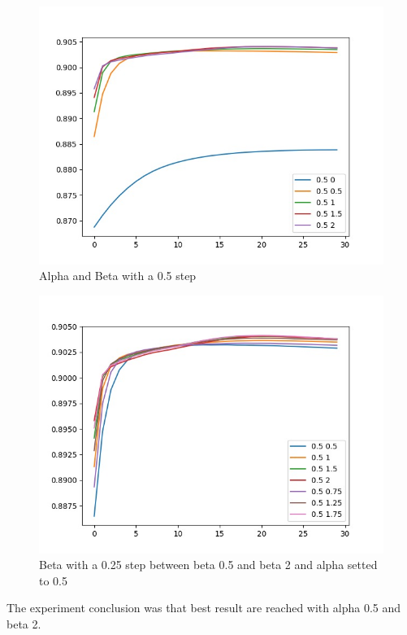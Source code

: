 \documentclass[12pt]{report}
\begin{document}
\begin{figure}[t]
    \centering
    \includegraphics[scale=.5]{alpha_beta1.jpeg}
    \caption{Alpha and Beta with a 0.5 step}
    \label{fig:alpha_beta1}
\end{figure}


\begin{figure}
    \centering
    \includegraphics[scale=.5]{alpha_beta3.jpeg}
    \caption{Beta with a 0.25 step between beta 0.5 and beta 2 and alpha setted to 0.5}
    \label{fig:alpha_beta3}
\end{figure}

The experiment conclusion was that best result are reached with alpha 0.5 and beta 2.
\end{document}
